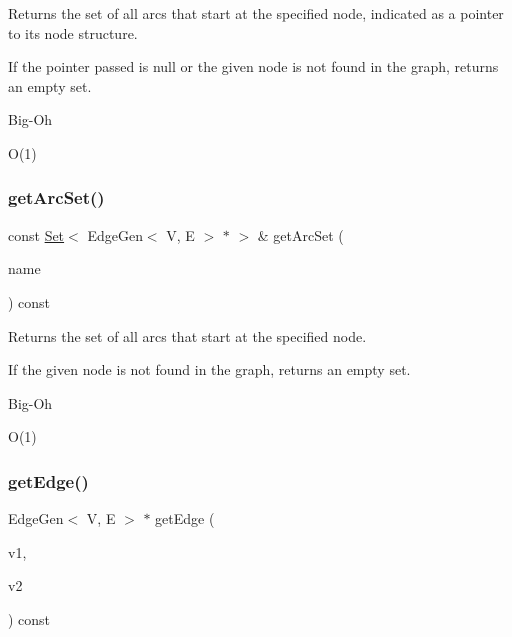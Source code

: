 Returns the set of all arcs that start at the specified node, indicated as a pointer to its node structure. 

If the pointer passed is null or the given node is not found in the graph, returns an empty set. \begin{DoxyRefDesc}{Big-\/\+Oh}
\item[\mbox{\hyperlink{BigOh__BigOh000063}{Big-\/\+Oh}}]O(1) \end{DoxyRefDesc}
\mbox{\label{classGraph_a31b9e2056ee2d66a7ea9feb02f016e8d}} 
\subsubsection{\texorpdfstring{get\+Arc\+Set()}{getArcSet()}\hspace{0.1cm}{\footnotesize\ttfamily [3/3]}}
{\footnotesize\ttfamily const \mbox{\hyperlink{classSet}{Set}}$<$ Edge\+Gen$<$ V, E $>$  $\ast$ $>$ \& get\+Arc\+Set (\begin{DoxyParamCaption}\item[{const std\+::string \&}]{name }\end{DoxyParamCaption}) const\hspace{0.3cm}{\ttfamily [inherited]}}



Returns the set of all arcs that start at the specified node. 

If the given node is not found in the graph, returns an empty set. \begin{DoxyRefDesc}{Big-\/\+Oh}
\item[\mbox{\hyperlink{BigOh__BigOh000064}{Big-\/\+Oh}}]O(1) \end{DoxyRefDesc}
\mbox{\label{classBasicGraphGen_aad31ac511c91ccf23a19af68e7a9f316}} 
\subsubsection{\texorpdfstring{get\+Edge()}{getEdge()}\hspace{0.1cm}{\footnotesize\ttfamily [1/2]}}
{\footnotesize\ttfamily Edge\+Gen$<$ V, E $>$ $\ast$ get\+Edge (\begin{DoxyParamCaption}\item[{\mbox{\hyperlink{classVertexGen}{Vertex\+Gen}}$<$ V, E $>$ $\ast$}]{v1,  }\item[{\mbox{\hyperlink{classVertexGen}{Vertex\+Gen}}$<$ V, E $>$ $\ast$}]{v2 }\end{DoxyParamCaption}) const}



